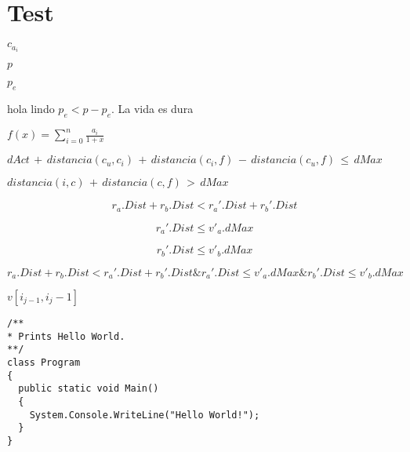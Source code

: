 
\chapter{Test}

$c_{a_i}$

$p$

$p_e$

hola lindo $p_e < p - p_e$. La vida es dura

\( f(x) = \sum_{i=0}^{n} \frac{a_i}{1+x} \)

\( dAct\, +\, distancia(c_u, c_i)\, +\, distancia(c_i, f)\, -\, distancia(c_u, f)\, \leq\, dMax\)

\( distancia(i, c)\, +\, distancia(c, f)\, >\, dMax\)


\begin{equation*}
r_a.Dist + r_b.Dist < r_a'.Dist + r_b'.Dist \nonumber
\end{equation*}

\begin{equation*}
r_a'.Dist \leq v'_a.dMax
\end{equation*}

\begin{equation*}
r_b'.Dist \leq v'_b.dMax
\end{equation*}

\( r_a.Dist + r_b.Dist < r_a'.Dist + r_b'.Dist \& r_a'.Dist \leq v'_a.dMax \& r_b'.Dist \leq v'_b.dMax \)

$v[i_{j-1}, i_j-1]$

\begin{lstlisting}
/**
* Prints Hello World.
**/
class Program
{
  public static void Main()
  {
    System.Console.WriteLine("Hello World!");
  }
}
\end{lstlisting}